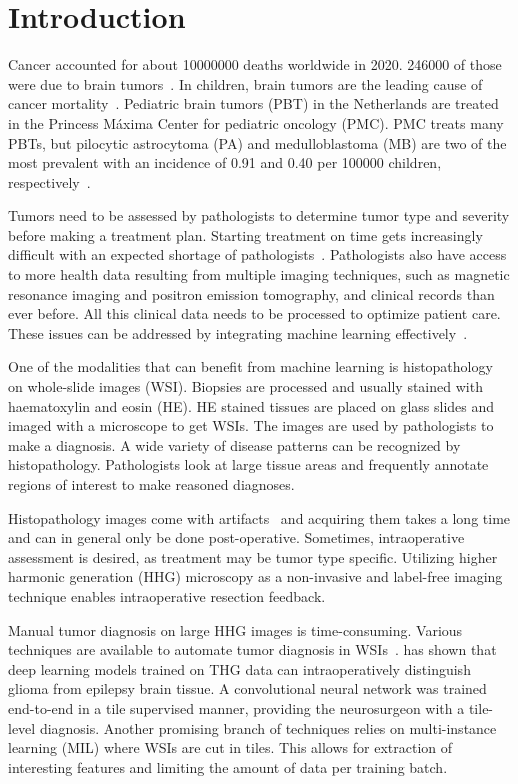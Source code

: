 \section{Introduction}

Cancer accounted for about \num{10000000} deaths worldwide in 2020.
\num{246000} of those were due to brain tumors~\cite{Kocarnik2022}.
In children, brain tumors are the leading cause of cancer mortality~\cite{Fahmideh2021}.
Pediatric brain tumors (PBT) in the Netherlands are treated in the Princess Máxima Center for pediatric oncology (PMC).
PMC treats many PBTs, but pilocytic astrocytoma (PA) and medulloblastoma (MB) are two of the most prevalent with an incidence of 0.91 and 0.40 per 100000 children, respectively~\cite{Fahmideh2021}.

Tumors need to be assessed by pathologists to determine tumor type and severity before making a treatment plan.
Starting treatment on time gets increasingly difficult with an expected shortage of pathologists~\cite{George2019}.
Pathologists also have access to more health data resulting from multiple imaging techniques, such as magnetic resonance imaging and positron emission tomography, and clinical records than ever before.
All this clinical data needs to be processed to optimize patient care.
These issues can be addressed by integrating machine learning effectively~\cite{Parwani2019}.

One of the modalities that can benefit from machine learning is histopathology on whole-slide images (WSI).
Biopsies are processed and usually stained with haematoxylin and eosin (HE).
HE stained tissues are placed on glass slides and imaged with a microscope to get WSIs.
The images are used by pathologists to make a diagnosis.
A wide variety of disease patterns can be recognized by histopathology.
Pathologists look at large tissue areas and frequently annotate regions of interest to make reasoned diagnoses.

Histopathology images come with artifacts~\cite{Taqi2018} and acquiring them takes a long time and can in general only be done post-operative.
Sometimes, intraoperative assessment is desired, as treatment may be tumor type specific.
Utilizing higher harmonic generation (HHG) microscopy as a non-invasive and label-free imaging technique enables intraoperative resection feedback.

Manual tumor diagnosis on large HHG images is time-consuming.
Various techniques are available to automate tumor diagnosis in WSIs~\cite{Litjens2017}.
\textcite{Blokker2022} has shown that deep learning models trained on THG data can intraoperatively distinguish glioma from epilepsy brain tissue.
A convolutional neural network was trained end-to-end in a tile supervised manner, providing the neurosurgeon with a tile-level diagnosis.
Another promising branch of techniques relies on multi-instance learning (MIL) where WSIs are cut in tiles.
This allows for extraction of interesting features and limiting the amount of data per training batch.


